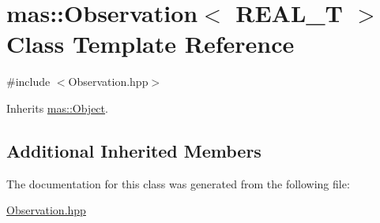 \hypertarget{classmas_1_1_observation}{}\section{mas\+:\+:Observation$<$ R\+E\+A\+L\+\_\+\+T $>$ Class Template Reference}
\label{classmas_1_1_observation}


{\ttfamily \#include $<$Observation.\+hpp$>$}



Inherits \hyperlink{classmas_1_1_object}{mas\+::\+Object}.

\subsection*{Additional Inherited Members}


The documentation for this class was generated from the following file\+:\begin{DoxyCompactItemize}
\item 
\hyperlink{_observation_8hpp}{Observation.\+hpp}\end{DoxyCompactItemize}
